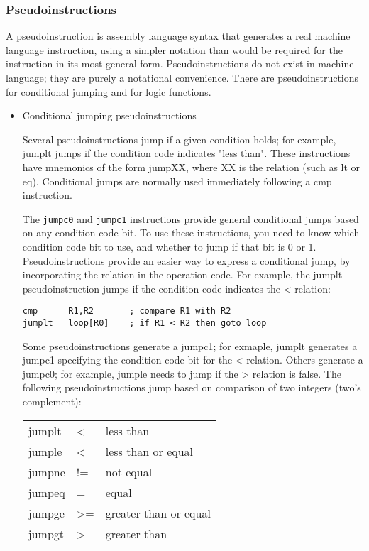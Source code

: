 \documentclass[11pt]{article}
\begin{document}
\subsubsection*{Pseudoinstructions}
\label{sec:orgfc7d924}

A pseudoinstruction is assembly language syntax that generates a real
machine language instruction, using a simpler notation than would be
required for the instruction in its most general form.
Pseudoinstructions do not exist in machine language; they are purely a
notational convenience.  There are pseudoinstructions for conditional
jumping and for logic functions.

\begin{itemize}
\item Conditional jumping pseudoinstructions
\label{sec:org76d2008}

Several pseudoinstructions jump if a given condition holds; for
example, jumplt jumps if the condition code indicates "less than".
These instructions have mnemonics of the form jumpXX, where XX is the
relation (such as lt or eq).  Conditional jumps are normally used
immediately following a cmp instruction.

The \texttt{jumpc0} and \texttt{jumpc1} instructions provide general conditional
jumps based on any condition code bit.  To use these instructions, you
need to know which condition code bit to use, and whether to jump if
that bit is 0 or 1.  Pseudoinstructions provide an easier way to
express a conditional jump, by incorporating the relation in the
operation code.  For example, the jumplt pseudoinstruction jumps if
the condition code indicates the < relation:

\begin{verbatim}
cmp      R1,R2       ; compare R1 with R2
jumplt   loop[R0]    ; if R1 < R2 then goto loop
\end{verbatim}

Some pseudoinstructions generate a jumpc1; for exmaple, jumplt
generates a jumpc1 specifying the condition code bit for the <
relation.  Others generate a jumpc0; for example, jumple needs to jump
if the > relation is false.  The following pseudoinstructions jump
based on comparison of two integers (two's complement):

\begin{center}
\begin{tabular}{lll}
jumplt & < & less than\\
jumple & <= & less than or equal\\
jumpne & != & not equal\\
jumpeq & = & equal\\
jumpge & >= & greater than or equal\\
jumpgt & > & greater than\\
\end{tabular}
\end{center}




\end{itemize}
\end{document}

